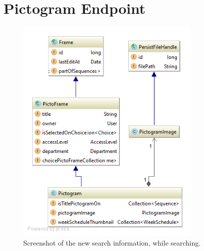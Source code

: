 \section{Pictogram Endpoint}

\begin{figure}[h]
    \centering
    \includegraphics[width=0.8\textwidth]{figures/diagram-pictogram.png}
    \caption{Screenshot of the new search information, while searching.}\label{fig:screenshot_newsearch}
\end{figure}
